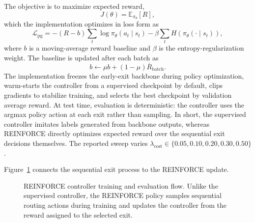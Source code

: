 \documentclass[10pt,twocolumn]{article}
\begin{document}
The objective is to maximize expected reward,
\begin{equation}
    J(\theta) = \mathbb{E}_{\pi_\theta}[R],
\end{equation}
which the implementation optimizes in loss form as
\begin{equation}
    \mathcal{L}_{\text{pg}}
    =
    -(R - b)\sum_t \log \pi_\theta(a_t \mid s_t)
    -
    \beta \sum_t H\!\left(\pi_\theta(\cdot \mid s_t)\right),
\end{equation}
where $b$ is a moving-average reward baseline and $\beta$ is the entropy-regularization weight. The baseline is updated after each batch as
\begin{equation}
    b \leftarrow \mu b + (1-\mu)\bar{R}_{\text{batch}}.
\end{equation}
The implementation freezes the early-exit backbone during policy optimization, warm-starts the controller from a supervised checkpoint by default, clips gradients to stabilize training, and selects the best checkpoint by validation average reward. At test time, evaluation is deterministic: the controller uses the argmax policy action at each exit rather than sampling. In short, the supervised controller imitates labels generated from backbone outputs, whereas REINFORCE directly optimizes expected reward over the sequential exit decisions themselves. The reported sweep varies $\lambda_{\text{cost}} \in \{0.05, 0.10, 0.20, 0.30, 0.50\}$.

Figure~\ref{fig:reinforce-policy} connects the sequential exit process to the REINFORCE update.

\begin{figure}[!tbp]
    \centering
    \caption{REINFORCE controller training and evaluation flow. Unlike the supervised controller, the REINFORCE policy samples sequential routing actions during training and updates the controller from the reward assigned to the selected exit.}
    \label{fig:reinforce-policy}
\end{figure}
\end{document}
